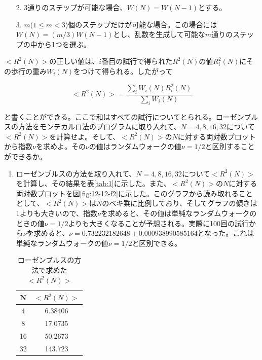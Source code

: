 \documentclass{jsarticle}
\begin{document}
\begin{enumerate}
\begin{enumerate}
                    \item[2.] 3通りのステップが可能な場合、$W(N)=W(N-1)$とする。
                    
                    \item[3.] $m$($1 \le m < 3$)個のステップだけが可能な場合。この場合には$W(N)=(m/3)W(N-1)$とし、乱数を生成して可能な$m$通りのステップの中から1つを選ぶ。
                \end{enumerate} 
            
            $<R^{2}(N)>$の正しい値は、$i$番目の試行で得られた$R^{2}(N)$の値$R^{2}_{i}(N)$にその歩行の重み$W_{i}(N)$をつけて得られる。したがって
                
            \begin{equation}
                <R^{2}(N)> = \frac{\sum_{i}W_{i}(N)R^{2}_{i}(N)}{\sum_{i}W_{i}(N)}
            \end{equation}

            と書くことができる。ここで和はすべての試行についてとられる。ローゼンブルスの方法をモンテカルロ法のプログラムに取り入れて、$N=4,8,16,32$について$<R^{2}(N)>$を計算せよ。そして、$<R^{2}(N)>$の$N$に対する両対数プロットから指数$\nu$を求めよ。その$\nu$の値はランダムウォークの値$\nu=1/2$と区別することができるか。
            
                \begin{enumerate}
                    \item ローゼンブルスの方法を取り入れて、$N=4,8,16,32$について$<R^{2}(N)>$を計算し、その結果を表\ref{tab:1}に示した。また、$<R^{2}(N)>$の$N$に対する両対数プロットを図\ref{fig:12-12-f2}に示した。このグラフから読み取れることとして、$<R^{2}(N)>$は$N$のベキ乗に比例しており、そしてグラフの傾きは1よりも大きいので、指数$\nu$を求めると、その値は単純なランダムウォークのときの値$\nu=1/2$よりも大きくなることが予想される。実際に100回の試行から$\nu$を求めると、$\nu = 0.732232182648 \pm 0.000938990585164$となった。これは単純なランダムウォークの値$\nu=1/2$と区別できる。

                    
                    \begin{table}[H]
                        \begin{center}
                            \caption{ローゼンブルスの方法で求めた$<R^{2}(N)>$}
                            \begin{tabular}{c|c} \hline
                                
                                N  &  $<R^{2}(N)>$ \\ \hline
                                4 & 6.38406 \\
                                8 & 17.0735 \\
                                16 & 50.2673 \\
                                32 & 143.723 \\ \hline
                                

\end{tabular}
\end{center}
\end{table}
\end{enumerate}
\end{enumerate}
\end{document}
